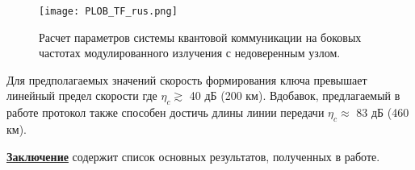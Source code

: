 \begin{figure}
	\texttt{[image: PLOB\_TF\_rus.png]}
	\caption{Расчет параметров системы квантовой коммуникации на боковых частотах модулированного излучения с недоверенным узлом.}
	\label{fig:PLOB_TF_rus}
\end{figure}


Для предполагаемых значений скорость формирования ключа превышает линейный предел скорости \cite{pirandola2017fundamental} где $\eta_c \gtrsim$ 40 дБ (200 км). Вдобавок, предлагаемый в работе протокол также способен достичь длины линии передачи $\eta_c\approx$ 83 дБ (460 км).


 \underline{\textbf{Заключение}} содержит список основных результатов, полученных в работе. 

  

